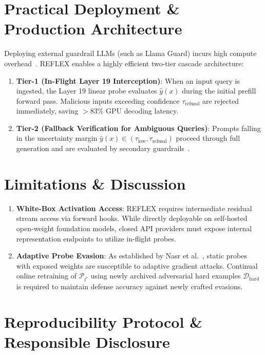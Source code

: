 \documentclass[manuscript,screen,review,anonymous]{acmart}
\begin{document}
\section{Practical Deployment \& Production Architecture}
Deploying external guardrail LLMs (such as Llama Guard) incurs high compute overhead~\cite{inan2023llama,meta2024llamaguard2,rebedea2023nemo}. REFLEX enables a highly efficient two-tier cascade architecture:
\begin{enumerate}[leftmargin=*]
    \item \textbf{Tier-1 (In-Flight Layer 19 Interception)}: When an input query is ingested, the Layer 19 linear probe evaluates $\hat{y}(x)$ during the initial prefill forward pass. Malicious inputs exceeding confidence $\tau_{\text{refusal}}$ are rejected immediately, saving $>83\%$ GPU decoding latency.
    \item \textbf{Tier-2 (Fallback Verification for Ambiguous Queries)}: Prompts falling in the uncertainty margin $\hat{y}(x) \in (\tau_{\text{low}}, \tau_{\text{refusal}})$ proceed through full generation and are evaluated by secondary guardrails~\cite{rebedea2023nemo,mu2024rule}.
\end{enumerate}

\section{Limitations \& Discussion}
\begin{enumerate}[leftmargin=*]
    \item \textbf{White-Box Activation Access}: REFLEX requires intermediate residual stream access via forward hooks. While directly deployable on self-hosted open-weight foundation models, closed API providers must expose internal representation endpoints to utilize in-flight probes.
    \item \textbf{Adaptive Probe Evasion}: As established by Nasr et al.~\cite{nasr2025adaptive}, static probes with exposed weights are susceptible to adaptive gradient attacks. Continual online retraining of $\mathcal{P}_{l^*}$ using newly archived adversarial hard examples $\mathcal{D}_{\text{hard}}$ is required to maintain defense accuracy against newly crafted evasions.
\end{enumerate}

\section{Reproducibility Protocol \& Responsible Disclosure}
\end{document}

